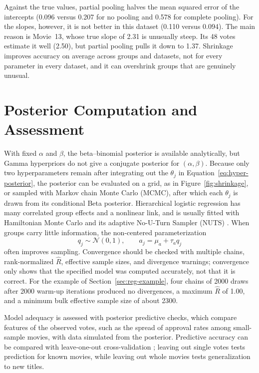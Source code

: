 \documentclass[11pt,a4paper]{article}
\newcommand{\Normal}{\mathcal{N}}
\begin{document}
Against the true values, partial pooling halves the mean squared error of the intercepts (0.096 versus 0.207 for no pooling and 0.578 for complete pooling). For the slopes, however, it is not better in this dataset (0.110 versus 0.094). The main reason is Movie~13, whose true slope of 2.31 is unusually steep. Its 48 votes estimate it well (2.50), but partial pooling pulls it down to 1.37. Shrinkage improves accuracy on average across groups and datasets, not for every parameter in every dataset, and it can overshrink groups that are genuinely unusual.

\section{Posterior Computation and Assessment}
With fixed $\alpha$ and $\beta$, the beta--binomial posterior is available analytically, but Gamma hyperpriors do not give a conjugate posterior for $(\alpha,\beta)$. Because only two hyperparameters remain after integrating out the $\theta_j$ in Equation~\eqref{eq:hyper-posterior}, the posterior can be evaluated on a grid, as in Figure~\ref{fig:shrinkage}, or sampled with Markov chain Monte Carlo (MCMC), after which each $\theta_j$ is drawn from its conditional Beta posterior. Hierarchical logistic regression has many correlated group effects and a nonlinear link, and is usually fitted with Hamiltonian Monte Carlo and its adaptive No-U-Turn Sampler (NUTS) \cite{hoffmangelman2014}. When groups carry little information, the non-centered parameterization
\begin{equation}
 q_j\sim\Normal(0,1),\qquad a_j=\mu_a+\tau_a q_j
 \label{eq:noncentered}
\end{equation}
often improves sampling. Convergence should be checked with multiple chains, rank-normalized $\widehat R$, effective sample sizes, and divergence warnings; convergence only shows that the specified model was computed accurately, not that it is correct. For the example of Section~\ref{sec:reg-example}, four chains of 2000 draws after 2000 warm-up iterations produced no divergences, a maximum $\widehat R$ of 1.00, and a minimum bulk effective sample size of about 2300.

Model adequacy is assessed with posterior predictive checks, which compare features of the observed votes, such as the spread of approval rates among small-sample movies, with data simulated from the posterior. Predictive accuracy can be compared with leave-one-out cross-validation \cite{vehtarietal2017}; leaving out single votes tests prediction for known movies, while leaving out whole movies tests generalization to new titles.
\end{document}
